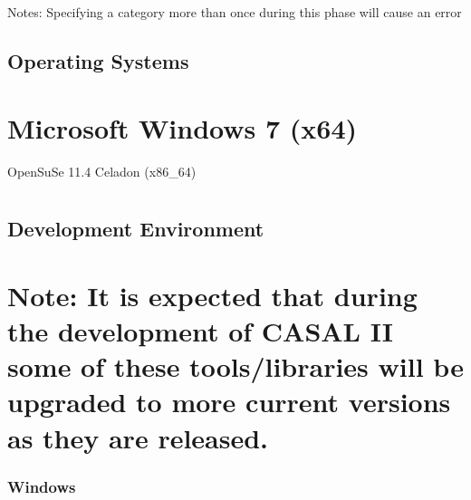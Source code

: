 \documentclass[a4paper,11pt,twoside,pdftex,draft]{article}
\begin{document}
Notes: Specifying a category more than once during this phase will cause
an error

\hypertarget{operating-systems}{%
\subsection[Operating
Systems]{\texorpdfstring{\protect\hypertarget{anchor-4}{}{}Operating
Systems}{Operating Systems}}\label{operating-systems}}

\hypertarget{microsoft-windows-7-x64}{%
\section[Microsoft Windows 7
(x64)]{\texorpdfstring{\protect\hypertarget{anchor-5}{}{}Microsoft
Windows 7
(x64)}{Microsoft Windows 7 (x64)}}\label{microsoft-windows-7-x64}}

\protect\hypertarget{anchor-6}{}{}OpenSuSe 11.4 Celadon (x86\_64)

\hypertarget{section-2}{%
\section{}\label{section-2}}

\hypertarget{development-environment}{%
\subsection[Development
Environment]{\texorpdfstring{\protect\hypertarget{anchor-7}{}{}Development
Environment}{Development Environment}}\label{development-environment}}

\hypertarget{note-it-is-expected-that-during-the-development-of-casal-ii-some-of-these-toolslibraries-will-be-upgraded-to-more-current-versions-as-they-are-released.}{%
\section{Note: It is expected that during the development of CASAL II
some of these tools/libraries will be upgraded to more current versions
as they are
released.}\label{note-it-is-expected-that-during-the-development-of-casal-ii-some-of-these-toolslibraries-will-be-upgraded-to-more-current-versions-as-they-are-released.}}

\hypertarget{windows}{%
\subsubsection[Windows]{\texorpdfstring{\protect\hypertarget{anchor-8}{}{}Windows}{Windows}}\label{windows}}
\end{document}
